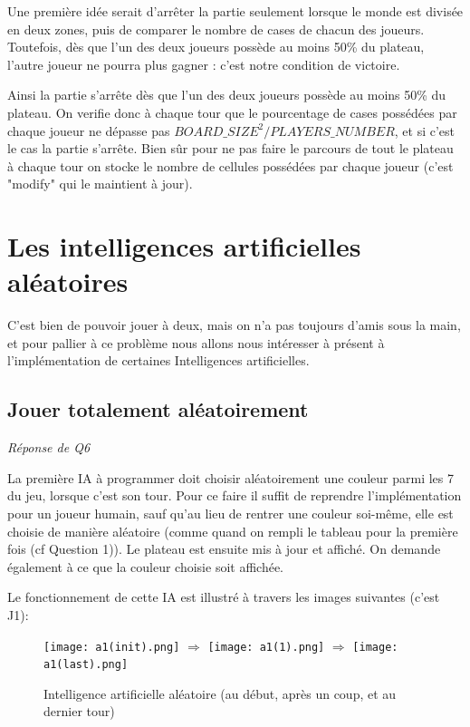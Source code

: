 \documentclass[a4paper,11pt]{article}
\begin{document}
Une première idée serait d'arrêter la partie seulement lorsque le monde est
divisée en deux zones, puis de comparer le nombre de cases de chacun des joueurs.
Toutefois, dès que l'un des deux joueurs possède au moins 50\% du plateau, l'autre joueur
ne pourra plus gagner : c'est notre condition de victoire. 

Ainsi la partie s'arrête dès que l'un des deux joueurs possède au moins 50\% du plateau.
On verifie donc à chaque tour que le pourcentage de cases possédées par chaque joueur ne dépasse pas $BOARD\_SIZE^2/PLAYERS\_NUMBER$, et si c'est le cas la partie s'arrête. Bien sûr pour ne pas faire le parcours de tout le plateau à chaque tour on stocke le nombre de cellules possédées par chaque joueur (c'est "modify" qui le maintient à jour).



\section{Les intelligences artificielles aléatoires}

C'est bien de pouvoir jouer à deux, mais on n'a pas toujours d'amis sous la
main, et pour pallier à ce problème nous allons nous intéresser à présent 
à l'implémentation de certaines Intelligences artificielles.

\subsection{Jouer totalement aléatoirement}
\emph{Réponse de Q6}

La première IA à programmer doit choisir aléatoirement une couleur parmi 
les 7 du jeu, lorsque c'est son tour. Pour ce faire il suffit de reprendre 
l'implémentation pour un joueur humain, sauf qu'au lieu de rentrer une couleur
soi-même, elle est choisie de manière aléatoire (comme quand on rempli le tableau
pour la première fois (cf Question 1)). Le plateau est ensuite mis à jour 
et affiché. On demande également à ce que la couleur choisie soit affichée.

Le fonctionnement de cette IA est illustré à travers les images suivantes (c'est J1):

\begin{figure}[!h]
\begin{center}
\texttt{[image: a1(init).png]}
{\Huge
\begin{math}
\Rightarrow
\end{math}}
\texttt{[image: a1(1).png]}
{\Huge
\begin{math}
\Rightarrow
\end{math}}
\texttt{[image: a1(last).png]}
\caption{Intelligence artificielle aléatoire (au début, après un coup, et au dernier tour)}
\end{center}
\end{figure}
\end{document}
